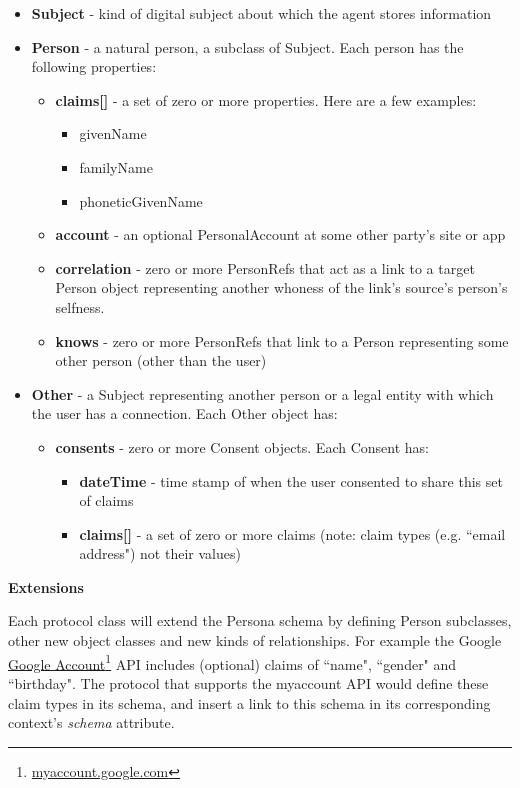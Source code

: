 \documentclass[11pt, oneside]{article}   	%
\newcommand{\hyperfootnote}[1][]{\def\ArgI{{#1}}\hyperfootnoteRelay}
\newcommand\hyperfootnoteRelay[2][]{\href{#1#2}{\ArgI}\footnote{\href{#1#2}{#2}}}
\begin{document}
\begin{itemize}
\item \textbf{Subject} - kind of digital subject about which the agent stores information
\item \textbf{Person} - a natural person, a subclass of Subject. Each person has the following properties:
	\begin{itemize}
	\item \textbf{claims[]} - a set of zero or more properties. Here are a few examples: 
		\begin{itemize}
		\item givenName
		\item familyName
		\item phoneticGivenName
		\end{itemize}
	\item \textbf{account} - an optional PersonalAccount at some other party's site or app
	\item \textbf{correlation} - zero or more PersonRefs that act as a link to a target Person object representing another whoness of the link's source's person's selfness.
	\item \textbf{knows} - zero or more PersonRefs that link to a Person representing some other person (other than the user)
	\end{itemize}
\item \textbf{Other} - a Subject representing another person or a legal entity with which the user has a connection. Each Other object has:
	\begin {itemize}
	\item \textbf{consents} - zero or more Consent objects. Each Consent has:
		\begin{itemize}
		\item \textbf{dateTime} - time stamp of when the user consented to share this set of claims
		\item \textbf{claims[]}  - a set of zero or more claims (note: claim types (e.g. ``email address") not their values)
		\end{itemize}
	\end{itemize}
\end{itemize}

\textbf{Extensions}

Each protocol class will extend the Persona schema by defining Person subclasses, other new object classes and new kinds of relationships. For example the Google
\hyperfootnote[Google Account][https://]{myaccount.google.com}  API includes (optional) claims of ``name", ``gender" and ``birthday". The protocol that supports the myaccount API would define these claim types in its schema, and insert a link to this schema in its corresponding context's \emph{schema} attribute.
\end{document}
